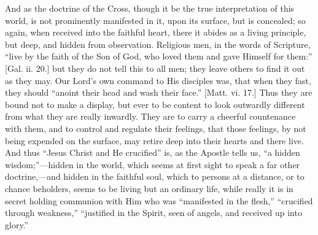 And as the doctrine of the Cross, though it be the
true interpretation of this world, is not prominently
manifested in it, upon its surface, but is concealed; so
again, when received into the faithful heart, there it
abides as a living principle, but deep, and hidden from
observation. Religious men, in the words of Scripture,
``live by the faith of the Son of God, who loved them
and gave Himself for them:'' [Gal. ii. 20.] but they
do not tell this to all men; they leave others to find it
out as they may. Our Lord's own command to His disciples
was, that when they fast, they should ``anoint their
head and wash their face.'' [Matt. vi. 17.] Thus they
are bound not to make a display, but ever to be content
to look outwardly different from what they are really
inwardly. They are to carry a cheerful countenance with
them, and to control and regulate their feelings, that
those feelings, by not being expended on the surface, may
retire deep into their hearts and there live. And thus
``Jesus Christ and He crucified'' is, as the
Apostle tells us, ``a hidden
wisdom;''—hidden in the world, which seems at
first sight to speak a far other doctrine,—and
hidden in the faithful soul, which to persons at a
distance, or to chance beholders, seems to be living but
an ordinary life, while really it is in secret holding
communion with Him who was ``manifested in the
flesh,'' ``crucified through weakness,''
``justified in the Spirit, seen of angels, and
received up into glory.''

